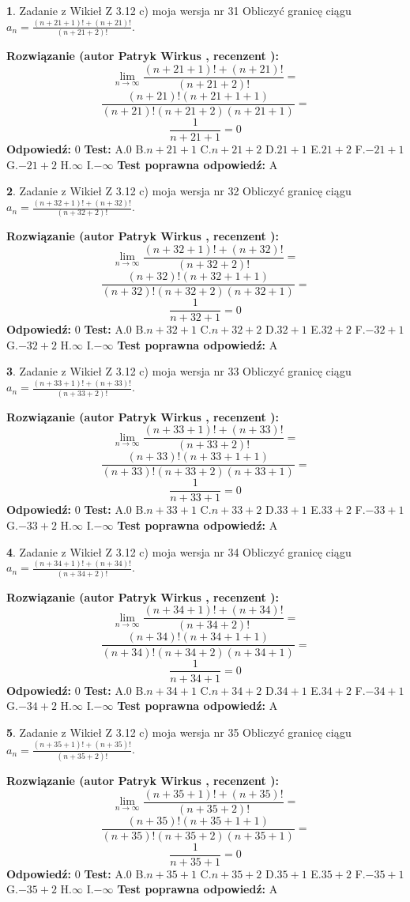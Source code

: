 \documentclass[12pt, a4paper]{article}
\theoremstyle{definition} %
\newtheorem{zad}{}
\newcommand{\zadStart}[1]{\begin{zad}#1\newline}
\newcommand{\zadStop}{\end{zad}}
\newcommand{\rozwStart}[2]{\noindent \textbf{Rozwiązanie (autor #1 , recenzent #2): }\newline}
\newcommand{\rozwStop}{\newline}
\newcommand{\odpStart}{\noindent \textbf{Odpowiedź:}\newline}
\newcommand{\odpStop}{\newline}
\newcommand{\testStart}{\noindent \textbf{Test:}\newline}
\newcommand{\testStop}{\newline}
\newcommand{\kluczStart}{\noindent \textbf{Test poprawna odpowiedź:}\newline}
\newcommand{\kluczStop}{\newline}
\begin{document}
\zadStart{Zadanie z Wikieł Z 3.12 c) moja wersja nr 31}
Obliczyć granicę ciągu $a_{n}=\frac{(n+21+1)!+(n+21)!}{(n+21+2)!}$.
\zadStop
\rozwStart{Patryk Wirkus}{}
$$\lim\limits_{n\to\infty}\frac{(n+21+1)!+(n+21)!}{(n+21+2)!}=$$
$$\frac{(n+21)!(n+21+1+1)}{(n+21)!(n+21+2)(n+21+1)}=$$
$$\frac{1}{n+21+1}= 0$$
\rozwStop
\odpStart
$0$
\odpStop
\testStart
A.$0$
B.$n+21+1$
C.$n+21+2$
D.$21+1$
E.$21+2$
F.$-21+1$
G.$-21+2$
H.$\infty$
I.$-\infty$
\testStop
\kluczStart
A
\kluczStop



\zadStart{Zadanie z Wikieł Z 3.12 c) moja wersja nr 32}
Obliczyć granicę ciągu $a_{n}=\frac{(n+32+1)!+(n+32)!}{(n+32+2)!}$.
\zadStop
\rozwStart{Patryk Wirkus}{}
$$\lim\limits_{n\to\infty}\frac{(n+32+1)!+(n+32)!}{(n+32+2)!}=$$
$$\frac{(n+32)!(n+32+1+1)}{(n+32)!(n+32+2)(n+32+1)}=$$
$$\frac{1}{n+32+1}= 0$$
\rozwStop
\odpStart
$0$
\odpStop
\testStart
A.$0$
B.$n+32+1$
C.$n+32+2$
D.$32+1$
E.$32+2$
F.$-32+1$
G.$-32+2$
H.$\infty$
I.$-\infty$
\testStop
\kluczStart
A
\kluczStop



\zadStart{Zadanie z Wikieł Z 3.12 c) moja wersja nr 33}
Obliczyć granicę ciągu $a_{n}=\frac{(n+33+1)!+(n+33)!}{(n+33+2)!}$.
\zadStop
\rozwStart{Patryk Wirkus}{}
$$\lim\limits_{n\to\infty}\frac{(n+33+1)!+(n+33)!}{(n+33+2)!}=$$
$$\frac{(n+33)!(n+33+1+1)}{(n+33)!(n+33+2)(n+33+1)}=$$
$$\frac{1}{n+33+1}= 0$$
\rozwStop
\odpStart
$0$
\odpStop
\testStart
A.$0$
B.$n+33+1$
C.$n+33+2$
D.$33+1$
E.$33+2$
F.$-33+1$
G.$-33+2$
H.$\infty$
I.$-\infty$
\testStop
\kluczStart
A
\kluczStop



\zadStart{Zadanie z Wikieł Z 3.12 c) moja wersja nr 34}
Obliczyć granicę ciągu $a_{n}=\frac{(n+34+1)!+(n+34)!}{(n+34+2)!}$.
\zadStop
\rozwStart{Patryk Wirkus}{}
$$\lim\limits_{n\to\infty}\frac{(n+34+1)!+(n+34)!}{(n+34+2)!}=$$
$$\frac{(n+34)!(n+34+1+1)}{(n+34)!(n+34+2)(n+34+1)}=$$
$$\frac{1}{n+34+1}= 0$$
\rozwStop
\odpStart
$0$
\odpStop
\testStart
A.$0$
B.$n+34+1$
C.$n+34+2$
D.$34+1$
E.$34+2$
F.$-34+1$
G.$-34+2$
H.$\infty$
I.$-\infty$
\testStop
\kluczStart
A
\kluczStop



\zadStart{Zadanie z Wikieł Z 3.12 c) moja wersja nr 35}
Obliczyć granicę ciągu $a_{n}=\frac{(n+35+1)!+(n+35)!}{(n+35+2)!}$.
\zadStop
\rozwStart{Patryk Wirkus}{}
$$\lim\limits_{n\to\infty}\frac{(n+35+1)!+(n+35)!}{(n+35+2)!}=$$
$$\frac{(n+35)!(n+35+1+1)}{(n+35)!(n+35+2)(n+35+1)}=$$
$$\frac{1}{n+35+1}= 0$$
\rozwStop
\odpStart
$0$
\odpStop
\testStart
A.$0$
B.$n+35+1$
C.$n+35+2$
D.$35+1$
E.$35+2$
F.$-35+1$
G.$-35+2$
H.$\infty$
I.$-\infty$
\testStop
\kluczStart
A
\kluczStop
\end{document}
